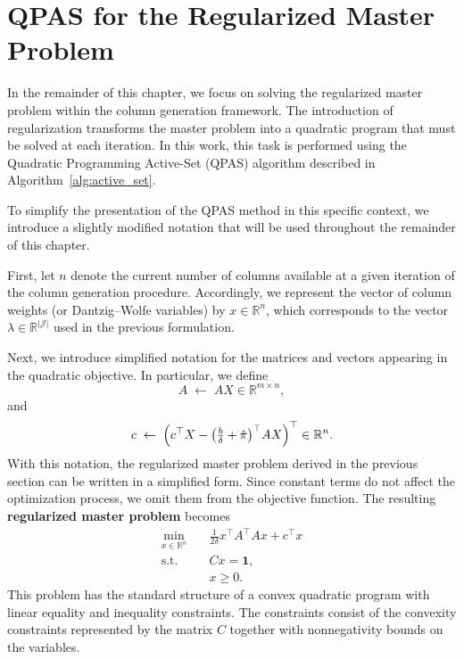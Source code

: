 \documentclass{book}
\theoremstyle{definition}
\newcounter{algorithm_}
\numberwithin{algorithm_}{chapter}
\begin{document}
\newpage

\section{QPAS for the Regularized Master Problem}

In the remainder of this chapter, we focus on solving the regularized master problem within the column generation framework. The introduction of regularization transforms the master problem into a quadratic program that must be solved at each iteration. In this work, this task is performed using the Quadratic Programming Active-Set (QPAS) algorithm described in Algorithm~\ref{alg:active_set}.

\bigskip

To simplify the presentation of the QPAS method in this specific context, we introduce a slightly modified notation that will be used throughout the remainder of this chapter.

\medskip

First, let $n$ denote the current number of columns available at a given iteration of the column generation procedure. Accordingly, we represent the vector of column weights (or Dantzig--Wolfe variables) by $x \in \mathbb{R}^n$,
which corresponds to the vector $\lambda \in \mathbb{R}^{|\mathcal{J}|}$ used in the previous formulation.

Next, we introduce simplified notation for the matrices and vectors appearing in the quadratic objective. In particular, we define
\[
A \;\leftarrow\; A X \in \mathbb{R}^{m \times n},
\]
and
\[
c \;\leftarrow\;
\Bigl(
c^\top X
-
\bigl(
\tfrac{b}{\delta} + \hat{\pi}
\bigr)^\top A X
\Bigr)^\top
\in \mathbb{R}^n.
\]
With this notation, the regularized master problem derived in the previous section can be written in a simplified form. Since constant terms do not affect the optimization process, we omit them from the objective function. The resulting \textbf{regularized master problem} becomes
\begin{subequations} \label{eq:regularized-master-simplified}
\begin{align}
\min_{x \in \mathbb{R}^n}
\quad
& \frac{1}{2\delta} x^\top A^\top A x
+ c^\top x
\\
\text{s.t.} \quad
& C x = \mathbf{1},
\\
& x \ge 0.
\end{align}
\end{subequations}
This problem has the standard structure of a convex quadratic program with linear equality and inequality constraints. The constraints consist of the convexity constraints represented by the matrix $C$ together with nonnegativity bounds on the variables.
\end{document}
